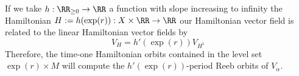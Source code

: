 
 
   \label{rem:increasingHamiltonian}
    If we take $h: \RR_{\geq 0}\to \RR$ a function with slope increasing to infinity the Hamiltonian $H:=h(\exp(r)): X\times \RR\to \RR$ our Hamiltonian vector field is related to the linear Hamiltonian vector fields by  
    \[V_H = h'(\exp(r)) V_{H^1}\]
    Therefore, the time-one Hamiltonian orbits contained in the level set $\exp(r)\times M$ will compute the $h'(\exp(r))$-period Reeb orbits of $V_\alpha$.
 